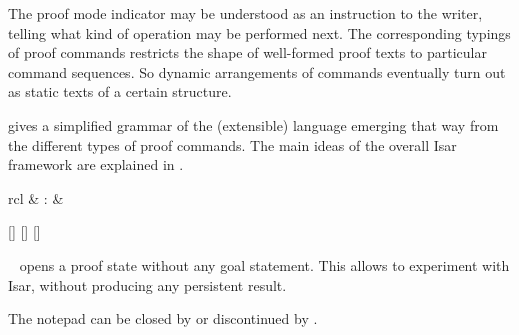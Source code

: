 \begin{isabellebody}
\begin{isamarkuptext}
  The proof mode indicator may be understood as an instruction to the
  writer, telling what kind of operation may be performed next.  The
  corresponding typings of proof commands restricts the shape of
  well-formed proof texts to particular command sequences.  So dynamic
  arrangements of commands eventually turn out as static texts of a
  certain structure.

   gives a simplified grammar of the (extensible)
  language emerging that way from the different types of proof
  commands.  The main ideas of the overall Isar framework are
  explained in .%
\end{isamarkuptext}%
\isamarkuptrue%
%
\isamarkuptrue%
%
\isamarkuptrue%
%
\begin{isamarkuptext}%
\begin{matharray}{rcl}
    \hypertarget{command.notepad}{\hyperlink{command.notepad}{\mbox{}}} & : &  \\
  \end{matharray}

  \begin{railoutput}
[]
[]
\rail@end
{}
[]
\rail@end
\end{railoutput}


  \begin{description}

  \item \hyperlink{command.notepad}{\mbox{}}~\hyperlink{keyword.begin}{\mbox{}} opens a proof state
  without any goal statement.  This allows to experiment with Isar,
  without producing any persistent result.

  The notepad can be closed by \hyperlink{command.end}{\mbox{}} or discontinued by
  \hyperlink{command.oops}{\mbox{}}.


\end{description}
\end{isamarkuptext}
\end{isabellebody}
